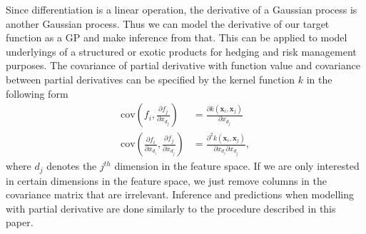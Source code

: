 \documentclass[11pt,a4paper]{article}
\theoremstyle{definition}
\numberwithin{equation}{section}
\let\vec\mathbf
\begin{document}
		Since differentiation is a linear operation, the derivative of a Gaussian process is another Gaussian process. Thus we can model the derivative of our target function as a GP and make inference from that. This can be applied to model underlyings of a structured or exotic products for hedging and risk management purposes. The covariance of partial derivative with function value and covariance between partial derivatives can be specified by the kernel function $k$ in the following form
		\begin{equation}
		\begin{split}
		\text{cov}\left(f_i,\frac{\partial f_j}{\partial x_{d_j}}\right)&=\frac{\partial k(\vec x_i,\vec x_j)}{\partial x_{d_j}}\\
		\text{cov}\left(\frac{\partial f_i}{\partial x_{d_i}},\frac{\partial f_j}{\partial x_{d_j}}\right)&=\frac{\partial^2 k(\vec x_i,\vec x_j)}{\partial x_{d_i}\partial x_{d_j}},
		\end{split}
		\end{equation}
		where $d_j$ denotes the $j^{th}$ dimension in the feature space. If we are only interested in certain dimensions in the feature space, we just remove columns in the covariance matrix that are irrelevant. Inference and predictions when modelling with partial derivative are done similarly to the procedure described in this paper.
		
		
		
		
		
		
\end{document}
